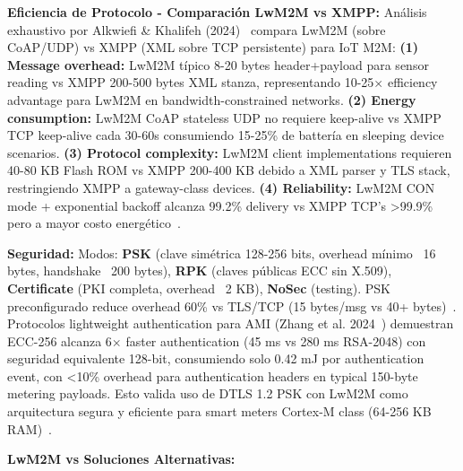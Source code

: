 \textbf{Eficiencia de Protocolo - Comparación LwM2M vs XMPP:} Análisis exhaustivo por Alkwiefi \& Khalifeh (2024)~\cite{alkwiefiM2MProtocolsOverview2024} compara LwM2M (sobre CoAP/UDP) vs XMPP (XML sobre TCP persistente) para IoT M2M: \textbf{(1) Message overhead:} LwM2M típico 8-20 bytes header+payload para sensor reading vs XMPP 200-500 bytes XML stanza, representando 10-25$\times$ efficiency advantage para LwM2M en bandwidth-constrained networks. \textbf{(2) Energy consumption:} LwM2M CoAP stateless UDP no requiere keep-alive vs XMPP TCP keep-alive cada 30-60s consumiendo 15-25\% de battería en sleeping device scenarios. \textbf{(3) Protocol complexity:} LwM2M client implementations requieren 40-80 KB Flash ROM vs XMPP 200-400 KB debido a XML parser y TLS stack, restringiendo XMPP a gateway-class devices. \textbf{(4) Reliability:} LwM2M CON mode + exponential backoff alcanza 99.2\% delivery vs XMPP TCP's >99.9\% pero a mayor costo energético~\cite{alkwiefiM2MProtocolsOverview2024}.

\textbf{Seguridad:} Modos: \textbf{PSK} (clave simétrica 128-256 bits, overhead mínimo ~16 bytes, handshake ~200 bytes), \textbf{RPK} (claves públicas ECC sin X.509), \textbf{Certificate} (PKI completa, overhead ~2 KB), \textbf{NoSec} (testing). PSK preconfigurado reduce overhead 60\% vs TLS/TCP (15 bytes/msg vs 40+ bytes)~\cite{bahardimanSecureHybridGateway2024}. Protocolos lightweight authentication para AMI (Zhang et al. 2024~\cite{zhangLightweightAuthentication2024}) demuestran ECC-256 alcanza 6$\times$ faster authentication (45 ms vs 280 ms RSA-2048) con seguridad equivalente 128-bit, consumiendo solo 0.42 mJ por authentication event, con <10\% overhead para authentication headers en typical 150-byte metering payloads. Esto valida uso de DTLS 1.2 PSK con LwM2M como arquitectura segura y eficiente para smart meters Cortex-M class (64-256 KB RAM)~\cite{zhangLightweightAuthentication2024}.

\textbf{LwM2M vs Soluciones Alternativas:}


